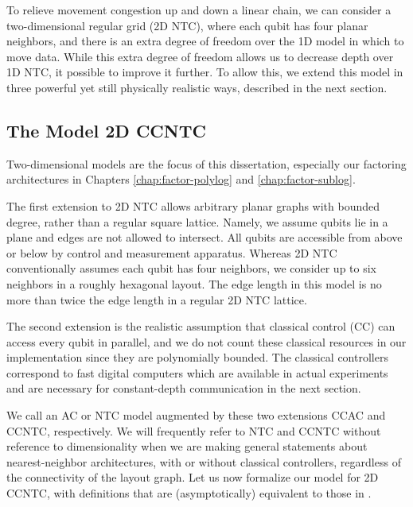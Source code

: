 To relieve movement congestion up and down a linear chain,
we can consider a two-dimensional regular grid
(\textsf{2D NTC}), where each
qubit has four planar neighbors, and 
there is an extra degree of freedom over the \textsc{1D} model
in which to move data. While this extra degree of freedom allows us to
decrease depth over \textsf{1D NTC}, it possible to improve it further.
To allow this, we extend this model in three powerful yet still physically
realistic ways, described in the next section.

\subsection{The Model \textsf{2D CCNTC}}
\label{subsec:2dccntc}

Two-dimensional models are the focus of this dissertation,
especially our factoring architectures in Chapters \ref{chap:factor-polylog}
and \ref{chap:factor-sublog}.

The first extension to \textsf{2D NTC} allows arbitrary planar graphs
with bounded degree, rather than a regular square lattice.
Namely, we assume qubits lie in a plane and edges are not allowed to intersect.
All qubits are accessible from above
or below by control and measurement apparatus.
Whereas \textsf{2D NTC} conventionally assumes each qubit
has four neighbors, we consider up to six neighbors in a roughly hexagonal
layout. The edge length in this model is no more than twice the edge length
in a regular \textsf{2D NTC} lattice.

The second extension is the realistic assumption
that classical control (CC) can
access every qubit in parallel, and we do not count these classical
resources in our implementation since they are polynomially bounded. The
classical controllers
correspond to fast digital computers which are
available in actual experiments and are necessary for constant-depth
communication in the next section.

We call an \textsf{AC} or \textsf{NTC} model augmented by these two extensions
\textsf{CCAC} and \textsf{CCNTC}, respectively.
We will frequently refer to \textsf{NTC} and \textsf{CCNTC} without
reference to dimensionality when we are making general statements about
nearest-neighbor architectures, with or without classical controllers,
regardless of the connectivity of the layout graph.
Let us now formalize our model for \textsf{2D CCNTC},
with definitions that are (asymptotically) equivalent to those in 
\cite{Rosenbaum2012}.

